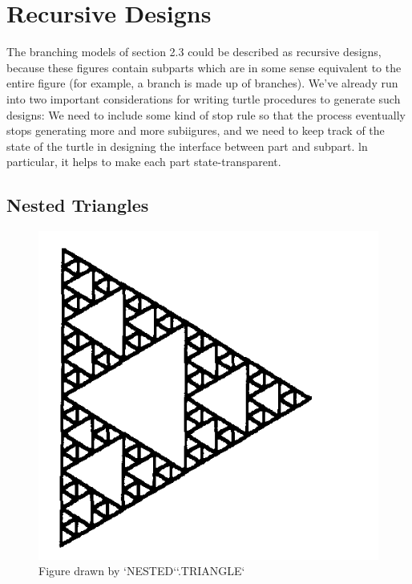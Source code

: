 \documentclass{book}
\begin{document}
\section{Recursive Designs}

The branching models of section 2.3 could be described as recursive
designs, because these figures contain subparts which are in some sense
equivalent to the entire figure (for example, a branch is made up of
branches). We've already run into two important considerations for
writing turtle procedures to generate such designs: We need to include
some kind of stop rule so that the process eventually stops generating
more and more subiigures, and we need to keep track of the state of the
turtle in designing the interface between part and subpart. ln particular,
it helps to make each part state-transparent.

\subsection{Nested Triangles}

\begin{figure}
\begin{center}
\includegraphics[scale=1]{fig2-23}
\caption{Figure drawn by \textsc{`NESTED`}\textsc{`.TRIANGLE`}}
\end{center}
\end{figure}
\end{document}
